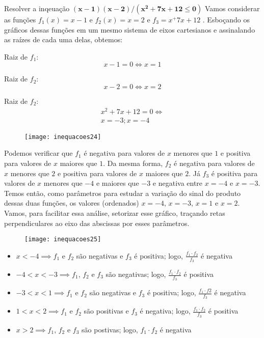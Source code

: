 \begin{example}{Resolver a inqeuação $\bm{(x-1)(x-2)/(x^2+7x+12\leq0)}$}
Vamos considerar as funções $f_1(x)=x-1$ e $f_2(x)=x=2$  e $f_3=x^+7x+12$ . Esboçando os gráficos dessas funções em um mesmo sistema de eixos cartesianos e assinalando as raízes de cada uma delas, obtemos:

\begin{multicols}{3}
\centering
Raiz de $f_1$:
\begin{equation*}
x-1=0\iff x=1
\end{equation*}

Raiz de $f_2$:
\begin{equation*}
x-2=0\iff x=2
\end{equation*}

Raiz de $f_2$:
\begin{gather*}
x^2+7x+12=0\iff\\ x=-3;x=-4
\end{gather*}
\end{multicols}

\begin{figure}[H]
\centering

\texttt{[image: inequacoes24]}
\end{figure}

Podemos verificar que $f_1$ é negativa para valores de $x$ menores que $1$ e positiva para valores de $x$ maiores que $1$. Da mesma forma, $f_2$ é negativa para valores de $x$ menores que $2$ e positiva para valores de $x$ maiores que $2$. Já $f_3$ é positiva para valores de $x$ menores que $-4$ e maiores que $-3$ e negativa entre $x=-4$  e $x=-3$. Temos então, como parâmetros para estudar a variação do sinal do produto dessas duas funções, os valores (ordenados) $x=-4$, $x=-3$, $x=1$ e $x=2$. Vamos, para facilitar essa análise, setorizar esse gráfico, traçando retas perpendiculares ao eixo das abscissas por esses parâmetros.

\begin{figure}[H]
\centering

\texttt{[image: inequacoes25]}
\end{figure}

\begin{itemize}
\item $x<-4\implies f_1$ e $f_2$ são negativas e $f_3$ é positiva; logo, $\frac{f_1\cdot f_2}{f_3}$ é negativa
\item $-4<x<-3 \implies f_1$, $f_2$ e $f_3$ são negativas; logo, $\frac{f_1\cdot f_2}{f_3}$ é positiva
\item $-3<x<1 \implies f_1$ e $f_2$ são negativas e $f_3$ é positiva; logo, $\frac{f_1\cdot f2}{f_3}$ é negativa
\item $1<x<2\implies f_1$ e $f_2$ são positivas e $f_3$ é negativa; logo, $\frac{f_1\cdot f_2}{f_3}$ é positiva
\item $x>2 \implies f_1$, $f_2$ e $f_3$ são postivas; logo, $f_1\cdot f_2$ é negativa
\end{itemize}



\end{example}
